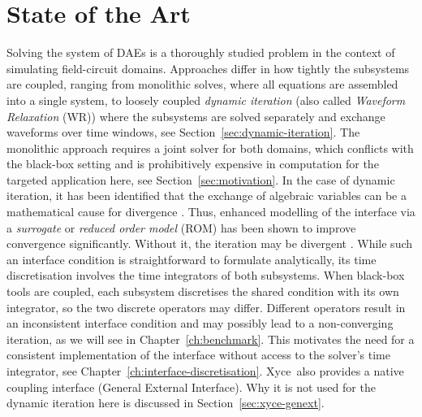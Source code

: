 \section{State of the Art}
Solving the system of DAEs is a thoroughly studied problem in the context of simulating field-circuit domains. Approaches differ in how tightly the subsystems are coupled, ranging from monolithic solves, where all equations are assembled into a single system, to loosely coupled \textit{dynamic iteration} (also called \textit{Waveform Relaxation} (WR)) where the subsystems are solved separately and exchange waveforms over time windows, see Section~\ref{sec:dynamic-iteration}. The monolithic approach requires a joint solver for both domains, which conflicts with the black-box setting and is prohibitively expensive in computation for the targeted application here, see Section~\ref{sec:motivation}. In the case of dynamic iteration, it has been identified that the exchange of algebraic variables can be a mathematical cause for divergence \cite{SchoepsDiss}. Thus, enhanced modelling of the interface via a \textit{surrogate} or \textit{reduced order model} (ROM) has been shown to improve convergence significantly. Without it, the iteration may be divergent \cite{Bartel2013}. While such an interface condition is straightforward to formulate analytically, its time discretisation involves the time integrators of both subsystems. When black-box tools are coupled, each subsystem discretises the shared condition with its own integrator, so the two discrete operators may differ.
Different operators result in an inconsistent interface condition and may possibly lead to a non-converging iteration, as we will see in Chapter~\ref{ch:benchmark}. This motivates the need for a consistent implementation of the interface without access to the solver's time integrator, see Chapter~\ref{ch:interface-discretisation}.
Xyce\texttrademark \ also provides a native coupling interface (General External Interface). Why it is not used for the dynamic iteration here is discussed in Section~\ref{sec:xyce-genext}.

